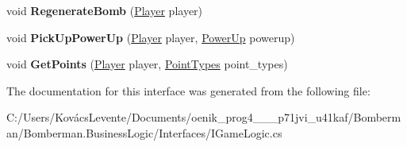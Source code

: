 \begin{DoxyCompactItemize}
void {\bfseries Regenerate\+Bomb} (\mbox{\hyperlink{class_bomberman_1_1_model_1_1_player}{Player}} player)
\item 
\mbox{\label{interface_bomberman_1_1_business_logic_1_1_i_game_logic_a39a42964d69896800487c012e3f5269c}} 
void {\bfseries Pick\+Up\+Power\+Up} (\mbox{\hyperlink{class_bomberman_1_1_model_1_1_player}{Player}} player, \mbox{\hyperlink{namespace_bomberman_1_1_model_a698c97744bc885fe16cc6f385fc501ef}{Power\+Up}} powerup)
\item 
\mbox{\label{interface_bomberman_1_1_business_logic_1_1_i_game_logic_ab80c096c8e9e76a7b494f41eac764a31}} 
void {\bfseries Get\+Points} (\mbox{\hyperlink{class_bomberman_1_1_model_1_1_player}{Player}} player, \mbox{\hyperlink{namespace_bomberman_1_1_model_ae2cd98abbbc849107bf2802cb1e7a8a3}{Point\+Types}} point\+\_\+types)
\end{DoxyCompactItemize}


The documentation for this interface was generated from the following file\+:\begin{DoxyCompactItemize}
\item 
C\+:/\+Users/\+Kovács\+Levente/\+Documents/oenik\+\_\+prog4\+\_\+\_\+\_\+p71jvi\+\_\+u41kaf/\+Bomberman/\+Bomberman.\+Business\+Logic/\+Interfaces/I\+Game\+Logic.\+cs\end{DoxyCompactItemize}
